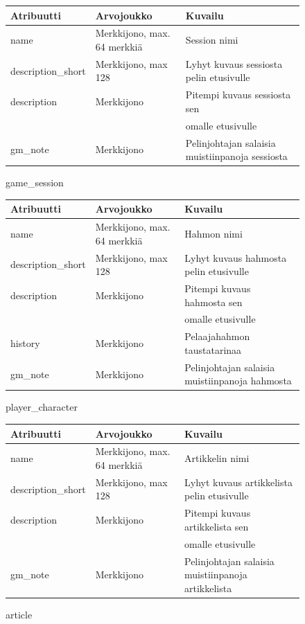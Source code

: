 \documentclass[11pt]{article}
\begin{document}
\begin{figure}[H]
\caption{game\_session}
\begin{tabular}{| l | l | l |}
\hline
Atribuutti & Arvojoukko & Kuvailu \\
\hline
name & Merkkijono, max. 64 merkkiä & Session nimi \\
\hline
description\_short & Merkkijono, max 128 & Lyhyt kuvaus sessiosta pelin etusivulle \\
\hline 
description & Merkkijono & Pitempi kuvaus sessiosta sen \\
& & omalle etusivulle \\
\hline
gm\_note & Merkkijono & Pelinjohtajan salaisia muistiinpanoja sessiosta \\
\hline
\end{tabular}
\end{figure}

\begin{figure}[H]
\caption{player\_character}
\begin{tabular}{| l | l | l |}
\hline
Atribuutti & Arvojoukko & Kuvailu \\
\hline
name & Merkkijono, max. 64 merkkiä & Hahmon nimi \\
\hline
description\_short & Merkkijono, max 128 & Lyhyt kuvaus hahmosta pelin etusivulle \\
\hline 
description & Merkkijono & Pitempi kuvaus hahmosta sen \\
& & omalle etusivulle \\
\hline
history & Merkkijono & Pelaajahahmon taustatarinaa \\
\hline
gm\_note & Merkkijono & Pelinjohtajan salaisia muistiinpanoja hahmosta \\
\hline
\end{tabular}
\end{figure}

\begin{figure}[H]
\caption{article}
\begin{tabular}{| l | l | l |}
\hline
Atribuutti & Arvojoukko & Kuvailu \\
\hline
name & Merkkijono, max. 64 merkkiä & Artikkelin nimi \\
\hline
description\_short & Merkkijono, max 128 & Lyhyt kuvaus artikkelista pelin etusivulle \\
\hline 
description & Merkkijono & Pitempi kuvaus artikkelista sen \\
& & omalle etusivulle \\
\hline
gm\_note & Merkkijono & Pelinjohtajan salaisia muistiinpanoja artikkelista \\
\hline
\end{tabular}
\end{figure}
\newpage
\end{document}
